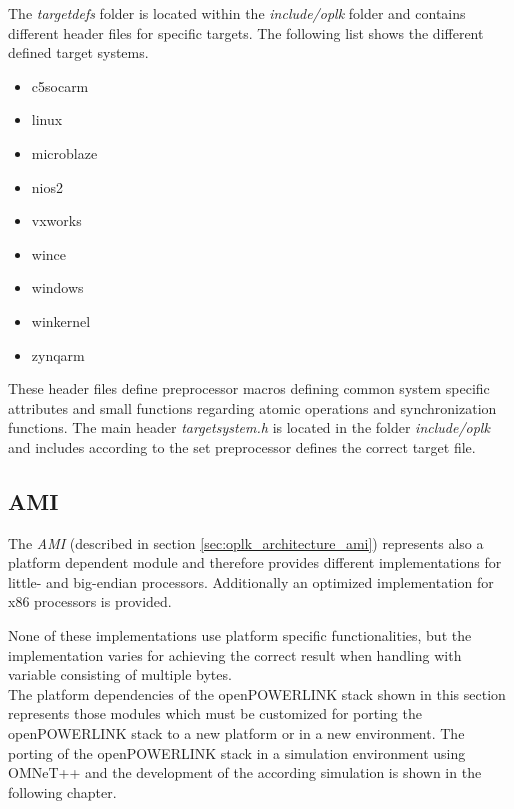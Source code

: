 \begin{description}[leftmargin=1cm]
    \item[targetdefs] The \emph{targetdefs} folder is located within the \emph{include/oplk} folder and contains different header files for specific targets.
    The following list shows the different defined target systems.
    \begin{multicols}{3}
        \begin{itemize}
            \item c5socarm
            \item linux
            \item microblaze
            \item nios2
            \item vxworks
            \item wince
            \item windows
            \item winkernel
            \item zynqarm
        \end{itemize}
    \end{multicols}
    These header files define preprocessor macros defining common system specific attributes and small functions regarding atomic operations and synchronization functions.
    The main header \emph{targetsystem.h} is located in the folder \emph{include/oplk} and includes according to the set preprocessor defines the correct target file. \\
    
        
\end{description}

\subsection{AMI}
\label{sec:oplk_platform_ami}

The \emph{AMI} (described in section \ref{sec:oplk_architecture_ami}) represents also a platform dependent module and therefore provides different implementations for little- and big-endian processors.
Additionally an optimized implementation for x86 processors is provided.

None of these implementations use platform specific functionalities, but the implementation varies for achieving the correct result when handling with variable consisting of multiple bytes.
\\

The platform dependencies of the openPOWERLINK stack shown in this section represents those modules which must be customized for porting the openPOWERLINK stack to a new platform or in a new environment.
The porting of the openPOWERLINK stack in a simulation environment using OMNeT++ and the development of the according simulation is shown in the following chapter.
